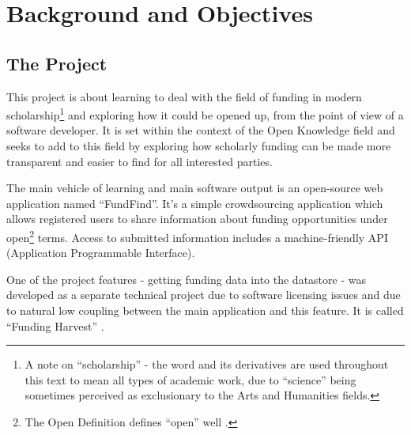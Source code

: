 \chapter{Background and Objectives}



\section{The Project}
This project is about learning to deal with the field of funding in modern scholarship\footnote{A note on ``scholarship'' - the word and its derivatives are used throughout this text to mean all types of academic work, due to ``science'' being sometimes perceived as exclusionary to the Arts and Humanities fields.} and exploring how it could be opened up, from the point of view of a software developer. It is set within the context of the Open Knowledge field and seeks to add to this field by exploring how scholarly funding can be made more transparent and easier to find for all interested parties.

The main vehicle of learning and main software output is an open-source web application named ``FundFind''. It's a simple crowdsourcing application which allows registered users to share information about funding opportunities under open\footnote{The Open Definition defines ``open'' well \cite{od}.} terms. Access to submitted information includes a machine-friendly API (Application Programmable Interface). %


One of the project features - getting funding data into the datastore - was developed as a separate technical project due to software licensing issues and due to natural low coupling between the main application and this feature. It is called ``Funding Harvest'' \cite{funding-harvest}.

